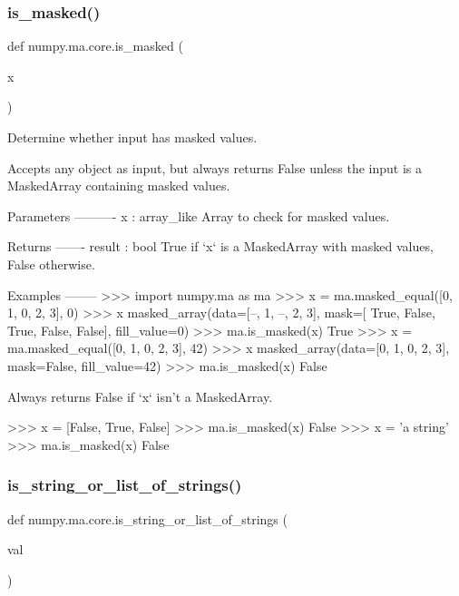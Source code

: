\subsubsection{\texorpdfstring{is\+\_\+masked()}{is\_masked()}}
{\footnotesize\ttfamily def numpy.\+ma.\+core.\+is\+\_\+masked (\begin{DoxyParamCaption}\item[{}]{x }\end{DoxyParamCaption})}

\begin{DoxyVerb}Determine whether input has masked values.

Accepts any object as input, but always returns False unless the
input is a MaskedArray containing masked values.

Parameters
----------
x : array_like
    Array to check for masked values.

Returns
-------
result : bool
    True if `x` is a MaskedArray with masked values, False otherwise.

Examples
--------
>>> import numpy.ma as ma
>>> x = ma.masked_equal([0, 1, 0, 2, 3], 0)
>>> x
masked_array(data=[--, 1, --, 2, 3],
             mask=[ True, False,  True, False, False],
       fill_value=0)
>>> ma.is_masked(x)
True
>>> x = ma.masked_equal([0, 1, 0, 2, 3], 42)
>>> x
masked_array(data=[0, 1, 0, 2, 3],
             mask=False,
       fill_value=42)
>>> ma.is_masked(x)
False

Always returns False if `x` isn't a MaskedArray.

>>> x = [False, True, False]
>>> ma.is_masked(x)
False
>>> x = 'a string'
>>> ma.is_masked(x)
False\end{DoxyVerb}
 \mbox{\label{namespacenumpy_1_1ma_1_1core_a9b70c4c2816e973d300f5577884ca7b8}} 
\subsubsection{\texorpdfstring{is\+\_\+string\+\_\+or\+\_\+list\+\_\+of\+\_\+strings()}{is\_string\_or\_list\_of\_strings()}}
{\footnotesize\ttfamily def numpy.\+ma.\+core.\+is\+\_\+string\+\_\+or\+\_\+list\+\_\+of\+\_\+strings (\begin{DoxyParamCaption}\item[{}]{val }\end{DoxyParamCaption})}

